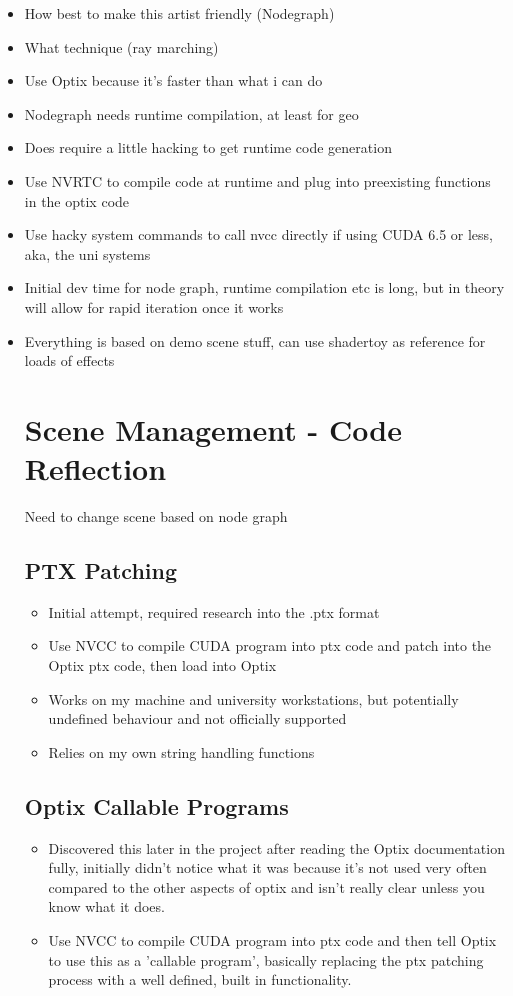 \documentclass[11pt,a4paper,final,notitlepage]{report}
\begin{document}
\begin{itemize}
	\item How best to make this artist friendly (Nodegraph)
	\item What technique (ray marching)
	\item Use Optix because it's faster than what i can do
	\item Nodegraph needs runtime compilation, at least for geo
	\item Does require a little hacking to get runtime code generation
	\item Use NVRTC to compile code at runtime and plug into preexisting functions in the optix code
	\item Use hacky system commands to call nvcc directly if using CUDA 6.5 or less, aka, the uni systems
	\item Initial dev time for node graph, runtime compilation etc is long, but in theory will allow for rapid iteration once it works
	\item Everything is based on demo scene stuff, can use shadertoy as reference for loads of effects
	\section{Scene Management - Code Reflection}
		Need to change scene based on node graph
	\subsection{PTX Patching}
		\begin{itemize}
			\item Initial attempt, required research into the .ptx format
			\item Use NVCC to compile CUDA program into ptx code and patch into the Optix ptx code, then load into Optix
			\item Works on my machine and university workstations, but potentially undefined behaviour and not officially supported
			\item Relies on my own string handling functions
		\end{itemize}
	\subsection{Optix Callable Programs}
		\begin{itemize}
			\item Discovered this later in the project after reading the Optix documentation fully, initially didn't notice what it was because it's not used very often compared to the other aspects of optix and isn't really clear unless you know what it does.
			\item Use NVCC to compile CUDA program into ptx code and then tell Optix to use this as a 'callable program', basically replacing the ptx patching process with a well defined, built in functionality.
			
		\end{itemize}
\end{itemize}
\end{document}
